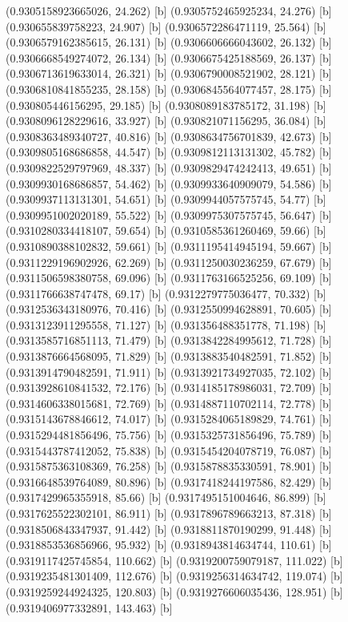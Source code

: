 {{{(0.9305158923665026, 24.262) [b] 
(0.9305752465925234, 24.276) [b] 
(0.930655839758223, 24.907) [b] 
(0.9306572286471119, 25.564) [b] 
(0.9306579162385615, 26.131) [b] 
(0.9306606666043602, 26.132) [b] 
(0.9306668549274072, 26.134) [b] 
(0.9306675425188569, 26.137) [b] 
(0.9306713619633014, 26.321) [b] 
(0.9306790008521902, 28.121) [b] 
(0.9306810841855235, 28.158) [b] 
(0.9306845564077457, 28.175) [b] 
(0.930805446156295, 29.185) [b] 
(0.9308089183785172, 31.198) [b] 
(0.9308096128229616, 33.927) [b] 
(0.930821071156295, 36.084) [b] 
(0.9308363489340727, 40.816) [b] 
(0.9308634756701839, 42.673) [b] 
(0.9309805168686858, 44.547) [b] 
(0.9309812113131302, 45.782) [b] 
(0.9309822529797969, 48.337) [b] 
(0.9309829474242413, 49.651) [b] 
(0.9309930168686857, 54.462) [b] 
(0.9309933640909079, 54.586) [b] 
(0.9309937113131301, 54.651) [b] 
(0.9309944057575745, 54.77) [b] 
(0.9309951002020189, 55.522) [b] 
(0.9309975307575745, 56.647) [b] 
(0.9310280334418107, 59.654) [b] 
(0.9310585361260469, 59.66) [b] 
(0.9310890388102832, 59.661) [b] 
(0.9311195414945194, 59.667) [b] 
(0.9311229196902926, 62.269) [b] 
(0.9311250030236259, 67.679) [b] 
(0.9311506598380758, 69.096) [b] 
(0.9311763166525256, 69.109) [b] 
(0.9311766638747478, 69.17) [b] 
(0.9312279775036477, 70.332) [b] 
(0.9312536343180976, 70.416) [b] 
(0.9312550994628891, 70.605) [b] 
(0.9313123911295558, 71.127) [b] 
(0.931356488351778, 71.198) [b] 
(0.9313585716851113, 71.479) [b] 
(0.9313842284995612, 71.728) [b] 
(0.9313876664568095, 71.829) [b] 
(0.9313883540482591, 71.852) [b] 
(0.9313914790482591, 71.911) [b] 
(0.9313921734927035, 72.102) [b] 
(0.9313928610841532, 72.176) [b] 
(0.9314185178986031, 72.709) [b] 
(0.9314606338015681, 72.769) [b] 
(0.9314887110702114, 72.778) [b] 
(0.9315143678846612, 74.017) [b] 
(0.9315284065189829, 74.761) [b] 
(0.9315294481856496, 75.756) [b] 
(0.9315325731856496, 75.789) [b] 
(0.9315443787412052, 75.838) [b] 
(0.9315454204078719, 76.087) [b] 
(0.9315875363108369, 76.258) [b] 
(0.9315878835330591, 78.901) [b] 
(0.9316648539764089, 80.896) [b] 
(0.9317418244197586, 82.429) [b] 
(0.9317429965355918, 85.66) [b] 
(0.9317495151004646, 86.899) [b] 
(0.9317625522302101, 86.911) [b] 
(0.9317896789663213, 87.318) [b] 
(0.9318506843347937, 91.442) [b] 
(0.9318811870190299, 91.448) [b] 
(0.9318853536856966, 95.932) [b] 
(0.9318943814634744, 110.61) [b] 
(0.9319117425745854, 110.662) [b] 
(0.9319200759079187, 111.022) [b] 
(0.9319235481301409, 112.676) [b] 
(0.9319256314634742, 119.074) [b] 
(0.9319259244924325, 120.803) [b] 
(0.9319276606035436, 128.951) [b] 
(0.9319406977332891, 143.463) [b] 
}}}
